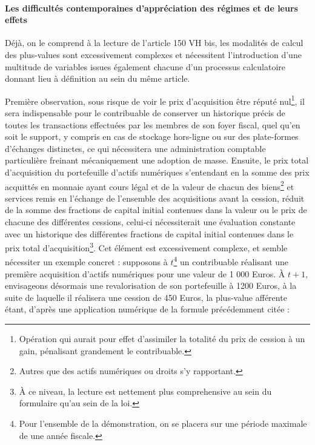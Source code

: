 {\paragraph{Les difficultés contemporaines d'appréciation des régimes et de leurs effets}

Déjà, on le comprend à la lecture de l'article 150 VH bis, les modalités de calcul des plus-values sont excessivement complexes et nécessitent l'introduction d'une multitude de variables issues également chacune d'un processus calculatoire donnant lieu à définition au sein du même article.\par

Première observation, sous risque de voir le prix d'acquisition être réputé nul\footnote{Opération qui aurait pour effet d'assimiler la totalité du prix de cession à un gain, pénalisant grandement le contribuable.}, il sera indispensable pour le contribuable de conserver un historique précis de toutes les transactions effectuées par les membres de son foyer fiscal, quel qu'en soit le support, y compris en cas de stockage hors-ligne ou sur des plate-formes d'échanges distinctes, ce qui nécessitera une administration comptable particulière freinant mécaniquement une adoption de masse. Ensuite, le prix total d'acquisition du portefeuille d'actifs numériques s'entendant en la somme des prix \og acquittés en monnaie ayant cours légal \fg{} et de la valeur de chacun des biens\footnote{Autres que des actifs numériques ou droits s'y rapportant.} et services remis en l'échange de l'ensemble des acquisitions avant la cession, réduit de la somme des fractions de capital initial contenues dans la valeur ou le prix de chacune des différentes cessions, celui-ci nécessiterait une évaluation constante avec un historique des différentes fractions de capital initial contenues dans le prix total d'acquisition\footnote{À ce niveau, la lecture est nettement plus comprehensive au sein du formulaire  qu'au sein de la loi.}. Cet élément est excessivement complexe, et semble nécessiter un exemple concret : supposons à $t$\footnote{Pour l'ensemble de la démonstration, on se placera sur une période maximale de une année fiscale.} un contribuable réalisant une première acquisition d'actifs numériques pour une valeur de 1 000 Euros. À $t+1$, envisageons désormais une revalorisation de son portefeuille à 1200 Euros, à la suite de laquelle il réalisera une cession de 450 Euros, la plus-value afférente étant, d'après une application numérique de la formule précédemment citée :

}
